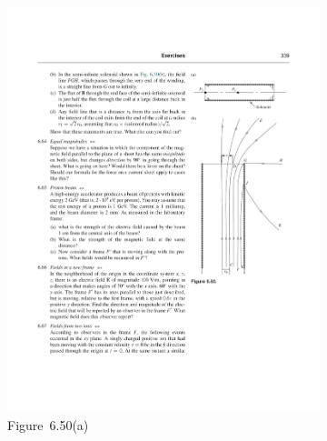 \documentclass{article}
\begin{document}
\begin{homeworkProblem}
\begin{figure}[H]
\begin{subfigure}[b]{0.5\textwidth}
			\includegraphics[width=\textwidth]{6_50a.pdf}
			\caption*{Figure~6.50(a)}
		\end{subfigure}
		\begin{subfigure}[b]{0.3\textwidth}

\end{subfigure}
\end{figure}
\end{homeworkProblem}
\end{document}
